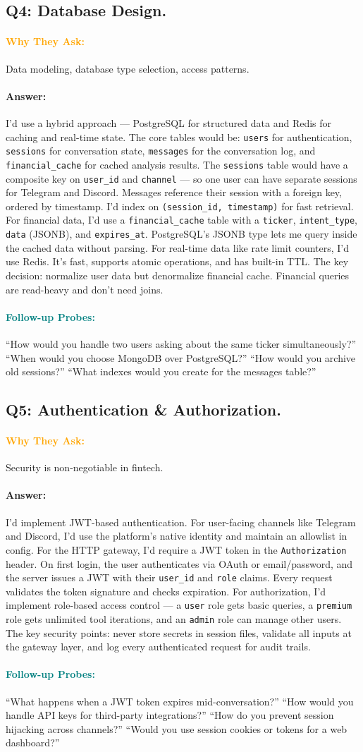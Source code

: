 \documentclass[11pt,a4paper]{article}
\newcommand{\Q}[1]{\subsection{#1}}
\newcommand{\Ans}[1]{\paragraph{\textbf{Answer:}} #1}
\newcommand{\Why}{\paragraph{\textcolor{orange}{\textbf{Why They Ask:}}}}
\newcommand{\Probe}{\paragraph{\textcolor{teal}{\textbf{Follow-up Probes:}}}}
\begin{document}
\Q{Q4: Database Design.}
\Why Data modeling, database type selection, access patterns.
\Ans I'd use a hybrid approach --- PostgreSQL for structured data and Redis for caching and real-time state. The core tables would be: \texttt{users} for authentication, \texttt{sessions} for conversation state, \texttt{messages} for the conversation log, and \texttt{financial\_cache} for cached analysis results. The \texttt{sessions} table would have a composite key on \texttt{user\_id} and \texttt{channel} --- so one user can have separate sessions for Telegram and Discord. Messages reference their session with a foreign key, ordered by timestamp. I'd index on \texttt{(session\_id, timestamp)} for fast retrieval. For financial data, I'd use a \texttt{financial\_cache} table with a \texttt{ticker}, \texttt{intent\_type}, \texttt{data} (JSONB), and \texttt{expires\_at}. PostgreSQL's JSONB type lets me query inside the cached data without parsing. For real-time data like rate limit counters, I'd use Redis. It's fast, supports atomic operations, and has built-in TTL. The key decision: normalize user data but denormalize financial cache. Financial queries are read-heavy and don't need joins.
\Probe ``How would you handle two users asking about the same ticker simultaneously?'' ``When would you choose MongoDB over PostgreSQL?'' ``How would you archive old sessions?'' ``What indexes would you create for the messages table?''

\Q{Q5: Authentication \& Authorization.}
\Why Security is non-negotiable in fintech.
\Ans I'd implement JWT-based authentication. For user-facing channels like Telegram and Discord, I'd use the platform's native identity and maintain an allowlist in config. For the HTTP gateway, I'd require a JWT token in the \texttt{Authorization} header. On first login, the user authenticates via OAuth or email/password, and the server issues a JWT with their \texttt{user\_id} and \texttt{role} claims. Every request validates the token signature and checks expiration. For authorization, I'd implement role-based access control --- a \texttt{user} role gets basic queries, a \texttt{premium} role gets unlimited tool iterations, and an \texttt{admin} role can manage other users. The key security points: never store secrets in session files, validate all inputs at the gateway layer, and log every authenticated request for audit trails.
\Probe ``What happens when a JWT token expires mid-conversation?'' ``How would you handle API keys for third-party integrations?'' ``How do you prevent session hijacking across channels?'' ``Would you use session cookies or tokens for a web dashboard?''
\end{document}
